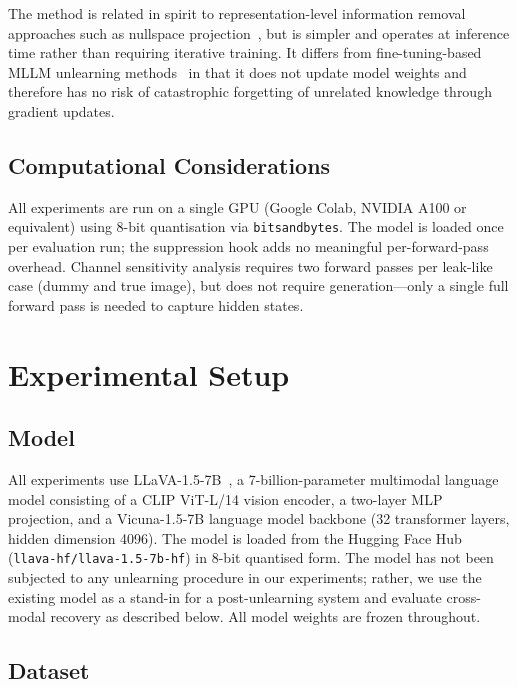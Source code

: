 \documentclass[12pt, a4paper]{article}
\begin{document}
The method is related in spirit to representation-level information removal approaches
such as nullspace projection~\citep{nullspace2020}, but is simpler and operates at
inference time rather than requiring iterative training.
It differs from fine-tuning-based MLLM unlearning methods~\citep{singleimage2024,
mmunlearner2025} in that it does not update model weights and therefore has no risk of
catastrophic forgetting of unrelated knowledge through gradient updates.

\subsection{Computational Considerations}

All experiments are run on a single GPU (Google Colab, NVIDIA A100 or equivalent)
using 8-bit quantisation via \texttt{bitsandbytes}.
The model is loaded once per evaluation run; the suppression hook adds no meaningful
per-forward-pass overhead.
Channel sensitivity analysis requires two forward passes per leak-like case (dummy and
true image), but does not require generation---only a single full forward pass is needed
to capture hidden states.


\section{Experimental Setup}
\label{sec:setup}

\subsection{Model}

All experiments use LLaVA-1.5-7B~\citep{clip2021}, a 7-billion-parameter
multimodal language model consisting of a CLIP ViT-L/14 vision encoder, a two-layer
MLP projection, and a Vicuna-1.5-7B language model backbone (32 transformer layers,
hidden dimension 4096).
The model is loaded from the Hugging Face Hub
(\texttt{llava-hf/llava-1.5-7b-hf}) in 8-bit quantised form.
The model has not been subjected to any unlearning procedure in our experiments;
rather, we use the existing model as a stand-in for a post-unlearning system and
evaluate cross-modal recovery as described below.
All model weights are frozen throughout.

\subsection{Dataset}
\end{document}
